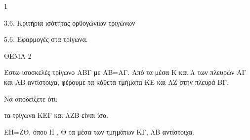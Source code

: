 \begin{ylh}{1}
    \item 3.6. Κριτήρια ισότητας ορθογώνιων τριγώνων
    \item 5.6. Εφαρμογές στα τρίγωνα.
\end{ylh}

ΘΕΜΑ 2

Έστω ισοσκελές τρίγωνο ΑΒΓ με ΑΒ=ΑΓ. Από τα μέσα Κ και Λ των πλευρών ΑΓ και ΑΒ αντίστοιχα, φέρουμε τα κάθετα τμήματα ΚΕ και ΛΖ στην πλευρά ΒΓ.

Να αποδείξετε ότι:

\begin{alist}
\item τα τρίγωνα ΚΕΓ και ΛΖΒ είναι ίσα. 

\item ΕΗ=ΖΘ, όπου Η , Θ τα μέσα των τμημάτων ΚΓ, ΛΒ αντίστοιχα. 


\begin{center}
\end{center}
\end{alist}
